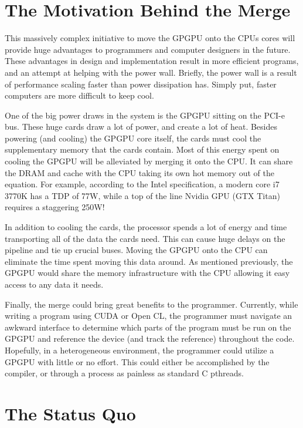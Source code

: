 \section*{The Motivation Behind the Merge}

This massively complex initiative to move the GPGPU onto the CPUs cores will provide huge advantages to programmers and computer designers in the future. These advantages in design and implementation result in more efficient programs, and an attempt at helping with the power wall. Briefly, the power wall is a result of performance scaling faster than power dissipation has. Simply put, faster computers are more difficult to keep cool.  

One of the big power draws in the system is the GPGPU sitting on the PCI-e bus. These huge cards draw a lot of power, and create a lot of heat. Besides powering (and cooling) the GPGPU core itself, the cards must cool the supplementary memory that the cards contain. Most of this energy spent on cooling the GPGPU will be alleviated by merging it onto the CPU. It can share the DRAM and cache with the CPU taking its own hot memory out of the equation. For example, according to the Intel specification, a modern core i7 3770K has a TDP of 77W, while a top of the line Nvidia GPU (GTX Titan) requires a staggering 250W! \cite{intelarc, nvidiapower}

In addition to cooling the cards, the processor spends a lot of energy and time transporting all of the data the cards need. This can cause huge delays on the pipeline and tie up crucial buses. Moving the GPGPU onto the CPU can eliminate the time spent moving this data around. As mentioned previously, the GPGPU would share the memory infrastructure with the CPU allowing it easy access to any data it needs. 

Finally, the merge could bring great benefits to the programmer. Currently, while writing a program using CUDA or Open CL, the programmer must navigate an awkward interface to determine which parts of the program must be run on the GPGPU and reference the device (and track the reference) throughout the code. Hopefully, in a heterogeneous environment, the programmer could utilize a GPGPU with little or no effort. This could either be accomplished by the compiler, or through a process as painless as standard C pthreads. 

\section*{The Status Quo}

